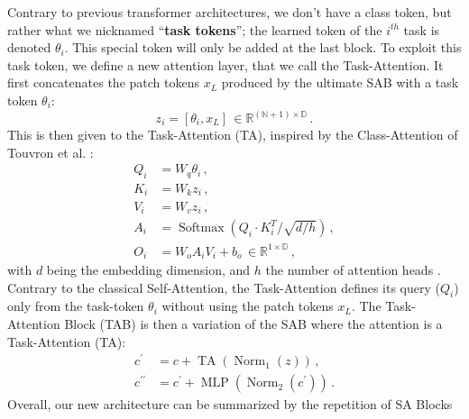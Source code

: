 Contrary to previous transformer architectures, we don't have a class token, but rather what we
nicknamed ``\textbf{task tokens}''; the learned token of the $i^{th}$ task is denoted $\theta_i$.
This special token will only be added at the last block. To exploit this task token, we define a new
attention layer, that we call the Task-Attention. It first concatenates the patch tokens $x_L$
produced by the ultimate SAB with a task token $\theta_i$:
%
\begin{equation}
    z_i = [\theta_i, x_L] \, \in \mathbb{R}^{(\mathbb{N} + 1) \times \mathbb{D}}\,.
    \label{eq:dytox_concat_cls_token}
\end{equation}
%
This is then given to the Task-Attention (TA), inspired by the Class-Attention of Touvron et al.
\citep{touvron2021cait}:
%
\begin{equation}
    \begin{aligned}
        Q_i & =W_{q} \theta_i\,,                                                      \\
        K_i & =W_{k} z_i\,,                                                           \\
        V_i & =W_{v} z_i\,,                                                           \\
        A_i & =\operatorname{Softmax}\left(Q_i \cdot K_i^{T} / \sqrt{d / h}\right)\,, \\
        O_i & = W_{o} A_i V_i+b_{o} \, \in \mathbb{R}^{1 \times \mathbb{D}}\,,
    \end{aligned}
    \label{eq:dytox_ca_layer}
\end{equation}
%
with $d$ being the embedding dimension, and $h$ the number of attention heads
\citep{vaswani2017transformer}. Contrary to the classical Self-Attention, the Task-Attention defines
its query ($Q_i$) only from the task-token $\theta_i$ without using the patch tokens $x_L$. The
Task-Attention Block (TAB) is then a variation of the SAB where the attention is a Task-Attention
(TA):
\begin{equation}
    \begin{aligned}
        c^{\prime}       & =c+\operatorname{TA}\left(\operatorname{Norm}_1\left(z\right)\right)\,,                    \\
        c^{\prime\prime} & =c^{\prime}+\operatorname{MLP}\left(\operatorname{Norm}_2\left(c^{\prime}\right)\right)\,.
    \end{aligned}
    \label{eq:dytox_ca_block}
\end{equation}
Overall, our new architecture can be summarized by the repetition of SA Blocks
